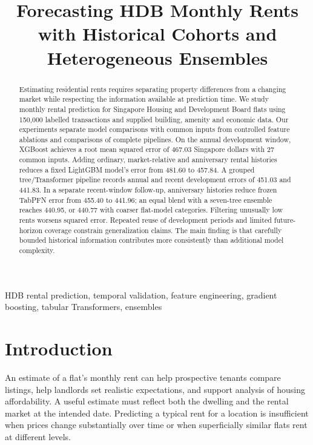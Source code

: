 \documentclass[conference]{IEEEtran}
\begin{document}
\title{Forecasting HDB Monthly Rents with Historical Cohorts and Heterogeneous Ensembles}
\author{
}
\maketitle

\begin{abstract}
Estimating residential rents requires separating property differences from a changing market while respecting the information available at prediction time. We study monthly rental prediction for Singapore Housing and Development Board flats using 150,000 labelled transactions and supplied building, amenity and economic data. Our experiments separate model comparisons with common inputs from controlled feature ablations and comparisons of complete pipelines. On the annual development window, XGBoost achieves a root mean squared error of 467.03 Singapore dollars with 27 common inputs. Adding ordinary, market-relative and anniversary rental histories reduces a fixed LightGBM model's error from 481.60 to 457.84. A grouped tree/Transformer pipeline records annual and recent development errors of 451.03 and 441.83. In a separate recent-window follow-up, anniversary histories reduce frozen TabPFN error from 455.40 to 441.96; an equal blend with a seven-tree ensemble reaches 440.95, or 440.77 with coarser flat-model categories. Filtering unusually low rents worsens squared error. Repeated reuse of development periods and limited future-horizon coverage constrain generalization claims. The main finding is that carefully bounded historical information contributes more consistently than additional model complexity.
\end{abstract}

\begin{IEEEkeywords}
HDB rental prediction, temporal validation, feature engineering, gradient boosting, tabular Transformers, ensembles
\end{IEEEkeywords}

\section{Introduction}
An estimate of a flat's monthly rent can help prospective tenants compare listings, help landlords set realistic expectations, and support analysis of housing affordability. A useful estimate must reflect both the dwelling and the rental market at the intended date. Predicting a typical rent for a location is insufficient when prices change substantially over time or when superficially similar flats rent at different levels.
\end{document}
